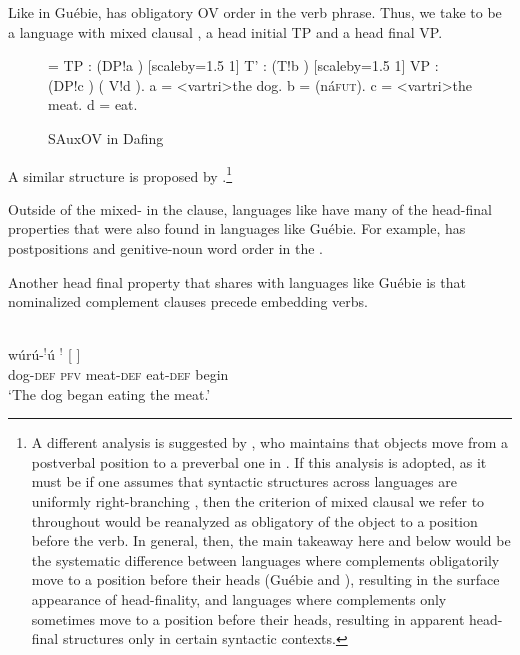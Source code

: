 \documentclass[output=paper]{LSP/langsci}
\begin{document}
Like in Gu\'ebie,  has obligatory OV order in the verb phrase. Thus, we take  to be a language with mixed clausal , a head initial TP and a head final VP.

\begin{figure}
\jtree[xunit=2.5em,yunit=1.25em]
\! = {TP}
: ({DP}!a ) [scaleby=1.5 1] {T'}
: ({T}!b ) [scaleby=1.5 1] {VP}
: ({DP}!c ) ( {V}!d ).
\!a = <vartri>{}{the dog}.
\!b = ({{n\'a}}{\textsc{fut}}).
\!c = <vartri>{}{the meat}.
\!d = {}{eat}.
\endjtree	
\caption{SAuxOV in Dafing}\label{fig:sande:dafingtree}
\end{figure}
A similar structure is proposed by \citet{nikitina09}.\footnote{\label{koopfn}A different analysis is suggested by \citet{Koopman:1984,koopman92}, who maintains that objects move from a postverbal position to a preverbal one in . If this analysis is adopted, as it must be if one assumes that syntactic structures across languages are uniformly right-branching \citep{kayne94}, then the criterion of mixed clausal  we refer to throughout would be reanalyzed as obligatory  of the object to a position before the verb. In general, then, the main takeaway here and below would be the systematic difference between languages where complements obligatorily move to a position before their heads (Gu\'ebie and ), resulting in the surface appearance of head-finality, and languages where complements only sometimes move to a position before their heads, resulting in apparent head-final structures only in certain syntactic contexts.}

Outside of the mixed- in the clause,  languages like  have many of the head-final properties that were also found in  languages like Gu\'ebie. For example,  has postpositions  and genitive-noun word order in the  . 

Another head final property that  shares with  languages like Gu\'ebie  is that nominalized complement clauses precede embedding verbs.

\ea {}\\
\gll w\'ur\'u-$^!$\'u {$^!$} [  \textbf{} ] \textbf{} \\
{dog}-\textsc{def} \textsc{pfv} {} meat-\textsc{def} eat-\textsc{def} {} begin\\
\glt `The dog began eating the meat.'
\z 
\end{document}
